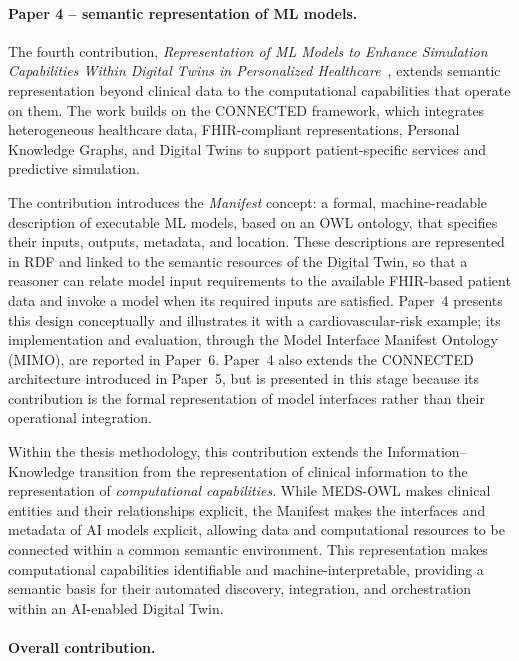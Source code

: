 \paragraph{Paper 4 -- semantic representation of ML models.}

The fourth contribution, \emph{Representation of ML Models to Enhance Simulation Capabilities Within Digital Twins in Personalized Healthcare}~\cite{marfoglia_2024_mimo}, extends semantic representation beyond clinical data to the computational capabilities that operate on them. The work builds on the CONNECTED framework, which integrates heterogeneous healthcare data, FHIR-compliant representations, Personal Knowledge Graphs, and Digital Twins to support patient-specific services and predictive simulation.

The contribution introduces the \emph{Manifest} concept: a formal, machine-readable description of executable ML models, based on an OWL ontology, that specifies their inputs, outputs, metadata, and location. These descriptions are represented in RDF and linked to the semantic resources of the Digital Twin, so that a reasoner can relate model input requirements to the available FHIR-based patient data and invoke a model when its required inputs are satisfied. Paper~4 presents this design conceptually and illustrates it with a cardiovascular-risk example; its implementation and evaluation, through the Model Interface Manifest Ontology (MIMO), are reported in Paper~6. Paper~4 also extends the CONNECTED architecture introduced in Paper~5, but is presented in this stage because its contribution is the formal representation of model interfaces rather than their operational integration.

Within the thesis methodology, this contribution extends the Information--Knowledge transition from the representation of clinical information to the representation of \emph{computational capabilities}. While MEDS-OWL makes clinical entities and their relationships explicit, the Manifest makes the interfaces and metadata of AI models explicit, allowing data and computational resources to be connected within a common semantic environment. This representation makes computational capabilities identifiable and machine-interpretable, providing a semantic basis for their automated discovery, integration, and orchestration within an AI-enabled Digital Twin.

\paragraph{Overall contribution.}

